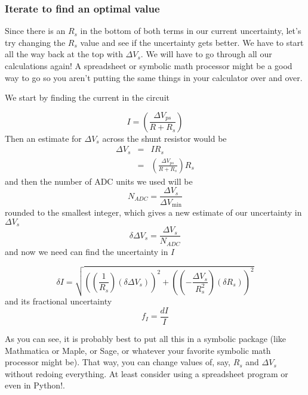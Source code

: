 \subsubsection{Iterate to find an optimal value}

Since there is an $R_{s}$ in the bottom of both terms in our current
uncertainty, let's try changing the $R_{s}$ value and see if the uncertainty
gets better. We have to start all the way back at the top with $\Delta
V_{s}. $ We will have to go through all our calculations again! A
spreadsheet or symbolic math processor might be a good way to go so you
aren't putting the same things in your calculator over and over.

We start by finding the current in the circuit

\begin{equation*}
I=\left( \frac{\Delta V_{ps}}{R+R_{s}}\right)
\end{equation*}%
Then an estimate for $\Delta V_{s}$ across the shunt resistor would be%
\begin{eqnarray*}
\Delta V_{s} &=&IR_{s} \\
&=&\left( \frac{\Delta V_{ps}}{R+R_{s}}\right) R_{s}
\end{eqnarray*}%
and then the number of ADC units we used will be 
\begin{equation*}
N_{ADC}=\frac{\Delta V_{s}}{\Delta V_{\min }}
\end{equation*}%
rounded to the smallest integer, which gives a new estimate of our
uncertainty in $\Delta V_{s}$ 
\begin{equation*}
\delta \Delta V_{s}=\frac{\Delta V_{s}}{N_{ADC}}
\end{equation*}%
and now we need can find the uncertainty in $I$

\begin{equation*}
\delta I=\sqrt{\left( \left( \frac{1}{R_{s}}\right) \left( \delta \Delta
V_{s}\right) \right) ^{2}+\left( \left( -\frac{\Delta V_{s}}{R_{s}^{2}}%
\right) \left( \delta R_{s}\right) \right) ^{2}}
\end{equation*}%
and its fractional uncertainty
\begin{equation*}
	f_{I}=\frac{dI}{I}
\end{equation*}

As you can see, it is probably best to put all this in a symbolic package
(like Mathmatica or Maple, or Sage, or whatever your favorite symbolic math
processor might be). That way, you can change values of, say, $R_{s}$ and $%
\Delta V_{s}$ without redoing everything. At least consider using a
spreadsheet program or even in Python!.

